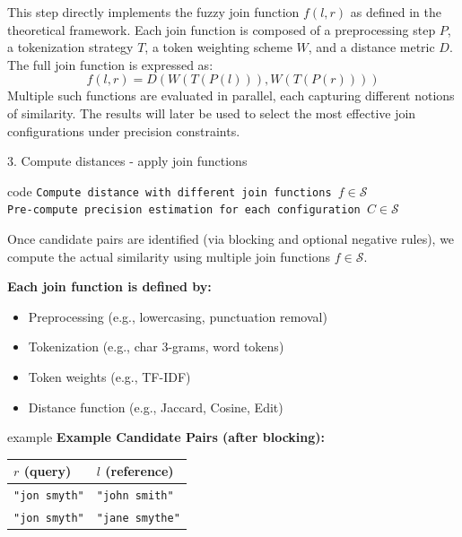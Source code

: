 \documentclass[8pt]{beamer} %
\begin{document}
\begin{frame}
	This step directly implements the fuzzy join function $f(l, r)$ as defined in the theoretical framework. Each join function is composed of a preprocessing step $P$, a tokenization strategy $T$, a token weighting scheme $W$, and a distance metric $D$. The full join function is expressed as:
	\[
	f(l, r) = D(W(T(P(l))), W(T(P(r))))
	\]
	Multiple such functions are evaluated in parallel, each capturing different notions of similarity. The results will later be used to select the most effective join configurations under precision constraints.
	
\end{frame}


\begin{frame}{3. Compute distances - apply join functions}
	
	\begin{beamercolorbox}[rounded=true, shadow=true, leftskip=1em, rightskip=1em]{code}
	\texttt{Compute distance with different join functions $f \in \mathcal{S}$}\\
	\texttt{Pre-compute precision estimation for each configuration $C \in \mathcal{S}$}
	\end{beamercolorbox}
	
	\vspace{0.5em}
	Once candidate pairs are identified (via blocking and optional negative rules), we compute the actual similarity using multiple join functions $f \in \mathcal{S}$.
	
	\vspace{0.5em}
	\textbf{Each join function is defined by:}
	\begin{itemize}
		\item Preprocessing (e.g., lowercasing, punctuation removal)
		\item Tokenization (e.g., char 3-grams, word tokens)
		\item Token weights (e.g., TF-IDF)
		\item Distance function (e.g., Jaccard, Cosine, Edit)
	\end{itemize}
	
	\vspace{0.5em}
	\begin{beamercolorbox}[rounded=true, shadow=true, leftskip=1em, rightskip=1em]{example}
		\textbf{Example Candidate Pairs (after blocking):}
		\begin{tabular}{ll}
			$r$ (query) & $l$ (reference) \\
			\hline
			\texttt{"jon smyth"} & \texttt{"john smith"} \\
			\texttt{"jon smyth"} & \texttt{"jane smythe"} \\
		\end{tabular}
		

\end{beamercolorbox}
\end{frame}
\end{document}
